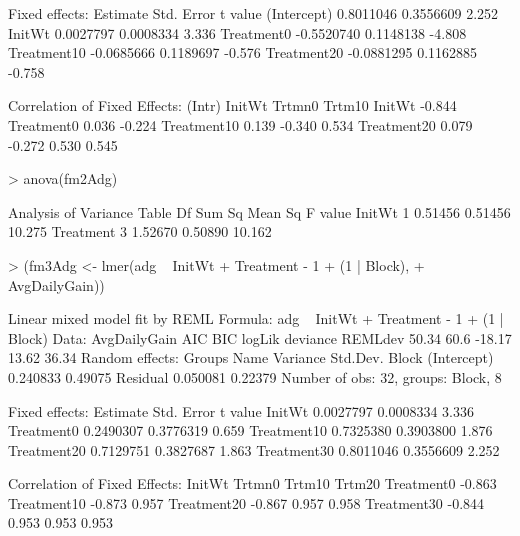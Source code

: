 \documentclass[12pt]{article}
\begin{document}
\begin{Schunk}
\begin{Soutput}
Fixed effects:
              Estimate Std. Error t value
(Intercept)  0.8011046  0.3556609   2.252
InitWt       0.0027797  0.0008334   3.336
Treatment0  -0.5520740  0.1148138  -4.808
Treatment10 -0.0685666  0.1189697  -0.576
Treatment20 -0.0881295  0.1162885  -0.758

Correlation of Fixed Effects:
            (Intr) InitWt Trtmn0 Trtm10
InitWt      -0.844                     
Treatment0   0.036 -0.224              
Treatment10  0.139 -0.340  0.534       
Treatment20  0.079 -0.272  0.530  0.545
\end{Soutput}
\begin{Sinput}
> anova(fm2Adg)
\end{Sinput}
\begin{Soutput}
Analysis of Variance Table
          Df  Sum Sq Mean Sq F value
InitWt     1 0.51456 0.51456  10.275
Treatment  3 1.52670 0.50890  10.162
\end{Soutput}
\begin{Sinput}
> (fm3Adg <- lmer(adg ~ InitWt + Treatment - 1 + (1 | Block), 
+     AvgDailyGain))
\end{Sinput}
\begin{Soutput}
Linear mixed model fit by REML 
Formula: adg ~ InitWt + Treatment - 1 + (1 | Block) 
   Data: AvgDailyGain 
   AIC  BIC logLik deviance REMLdev
 50.34 60.6 -18.17    13.62   36.34
Random effects:
 Groups   Name        Variance Std.Dev.
 Block    (Intercept) 0.240833 0.49075 
 Residual             0.050081 0.22379 
Number of obs: 32, groups: Block, 8

Fixed effects:
             Estimate Std. Error t value
InitWt      0.0027797  0.0008334   3.336
Treatment0  0.2490307  0.3776319   0.659
Treatment10 0.7325380  0.3903800   1.876
Treatment20 0.7129751  0.3827687   1.863
Treatment30 0.8011046  0.3556609   2.252

Correlation of Fixed Effects:
            InitWt Trtmn0 Trtm10 Trtm20
Treatment0  -0.863                     
Treatment10 -0.873  0.957              
Treatment20 -0.867  0.957  0.958       
Treatment30 -0.844  0.953  0.953  0.953
\end{Soutput}
\end{Schunk}
\end{document}
